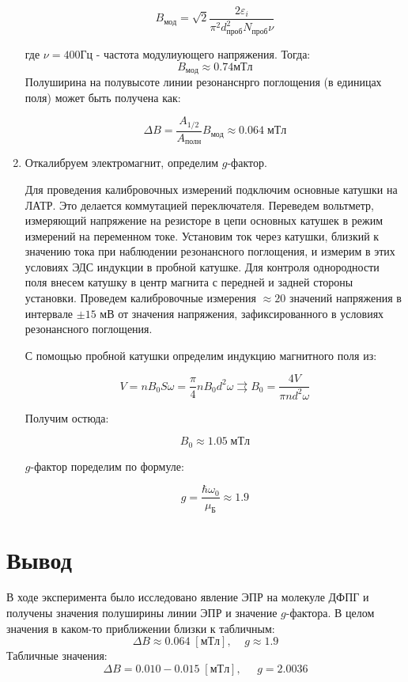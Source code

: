 \documentclass[a4paper]{article}
\begin{document}
\begin{enumerate}
    \begin{equation}
        B_{мод} = \sqrt{2} \frac{2 \varepsilon_i}{\pi^2 d_{проб}^2 N_{проб} \nu}
    \end{equation}

    где $\nu = 400 Гц$ - частота модулиующего напряжения.
    Тогда:
    $$B_{мод} \approx 0.74 мТл$$ 
    Полуширина на полувысоте линии резонанснрго поглощения 
    (в единицах поля) может быть получена как:

    \begin{equation}
        \Delta B = \frac{A_{1/2}}{A_{полн}} B_{мод} \approx 0.064\;мТл
    \end{equation}


    \item Откалибруем электромагнит, определим $g$-фактор. \par 
    Для проведения калибровочных измерений подключим основные катушки на ЛАТР. Это делается коммутацией переключателя.
    Переведем вольтметр, измеряющий напряжение на резисторе в цепи основных катушек в режим измерений на переменном токе.
    Установим ток через катушки, близкий к значению тока при наблюдении резонансного поглощения, и измерим в этих условиях ЭДС 
    индукции в пробной катушке. Для контроля однородности поля внесем катушку в центр магнита с передней и задней стороны установки. 
    Проведем калибровочные измерения $\approx 20 $ значений напряжения в интервале $\pm 15$ мВ от значения напряжения, зафиксированного 
    в условиях резонансного поглощения. \par 

    С помощью пробной катушки определим индукцию магнитного поля из:

    \begin{equation}
        V = nB_0S\omega = \frac{\pi}{4} n B_0 d^2\omega \rightrightarrows B_0 = \frac{4V}{\pi n d^2 \omega}
    \end{equation}

    Получим остюда:

    $$B_0 \approx 1.05 \; мТл$$

    $g$-фактор поределим по формуле:

    \begin{equation}
        g = \frac{\hbar \omega_0}{\mu_Б} \approx 1.9
    \end{equation}
\end{enumerate}



\section{Вывод}
В ходе эксперимента было исследовано явление ЭПР на молекуле ДФПГ и получены значения полуширины линии ЭПР и значение $g$-фактора.
В целом значения в каком-то приближении близки к табличным: 
$$\Delta B \approx 0.064\;[мТл],\;\;\;\; g \approx 1.9 $$
Табличные значения: 
$$\Delta B = 0.010-0.015\; [мТл],\;\;\;\;\; g = 2.0036$$
\end{document}
